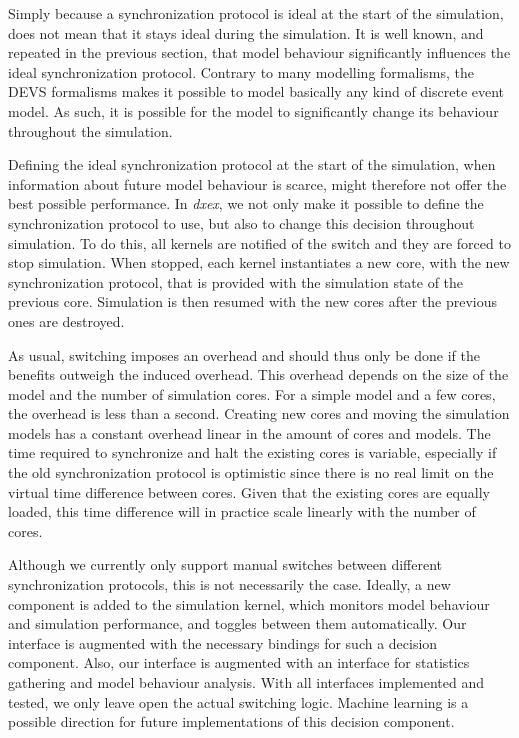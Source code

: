 Simply because a synchronization protocol is ideal at the start of the simulation, does not mean that it stays ideal during the simulation.
It is well known, and repeated in the previous section, that model behaviour significantly influences the ideal synchronization protocol.
Contrary to many modelling formalisms, the \textsf{DEVS} formalisms makes it possible to model basically any kind of discrete event model.
As such, it is possible for the model to significantly change its behaviour throughout the simulation.

Defining the ideal synchronization protocol at the start of the simulation, when information about future model behaviour is scarce, might therefore not offer the best possible performance.
In \textit{dxex}, we not only make it possible to define the synchronization protocol to use, but also to change this decision throughout simulation.
To do this, all kernels are notified of the switch and they are forced to stop simulation.
When stopped, each kernel instantiates a new core, with the new synchronization protocol, that is provided with the simulation state of the previous core. 
Simulation is then resumed with the new cores after the previous ones are destroyed. 

As usual, switching imposes an overhead and should thus only be done if the benefits outweigh the induced overhead.
This overhead depends on the size of the model and the number of simulation cores.
For a simple model and a few cores, the overhead is less than a second. 
Creating new cores and moving the simulation models has a constant overhead linear in the amount of cores and models. The time required to synchronize and halt the existing cores is variable, especially if the old synchronization protocol is optimistic since there is no real limit on the virtual time difference between cores. Given that the existing cores are equally loaded, this time difference will in practice scale linearly with the number of cores.

Although we currently only support manual switches between different synchronization protocols, this is not necessarily the case.
Ideally, a new component is added to the simulation kernel, which monitors model behaviour and simulation performance, and toggles between them automatically.
Our interface is augmented with the necessary bindings for such a decision component.
Also, our interface is augmented with an interface for statistics gathering and model behaviour analysis.
With all interfaces implemented and tested, we only leave open the actual switching logic.
Machine learning is a possible direction for future implementations of this decision component.

